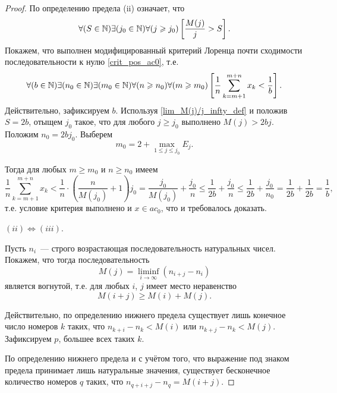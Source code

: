 \begin{proof}
	По определению предела (ii) означает, что
	\begin{equation}\label{lim_M(j)/j_infty_def}
		\forall(S  \in\mathbb{N})
		\exists(j_0\in\mathbb{N})
		\forall(j \geqslant j_0)
		\left[
			\frac{M(j)}{j}>S
		\right]
		.
	\end{equation}
	Покажем, что выполнен модифицированный критерий Лоренца почти сходимости последовательности к нулю
	\eqref{crit_pos_ac0}, т.е.
	\begin{equation}
		\forall(b  \in\mathbb{N})
		\exists(n_0\in\mathbb{N})
		\exists(m_0\in\mathbb{N})
		\forall(n\geqslant n_0)
		\forall(m\geqslant m_0)
		\\
		\left[
			\frac{1}{n}
			\sum_{k=m+1}^{m+n} x_k
			<
			\frac{1}{b}
		\right]
		.
	\end{equation} Действительно, зафиксируем $b$.
	Используя \eqref{lim_M(j)/j_infty_def} и положив $S=2b$,
	отыщем $j_0$ такое, что для любого $j\geq j_0$ выполнено
	$M(j)>2bj$.
	Положим $n_0 = 2bj_0$.
	Выберем
	$$
		m_0 = 2+\max_{1\leq j \leq j_0} E_j
		.
	$$

	Тогда для любых $m\geq m_0$ и $n\geq n_0$ имеем
	\begin{equation}
		\frac{1}{n} \sum_{k=m+1}^{m+n} x_k
		<
		\frac{1}{n} \cdot \left( \frac{n}{M(j_0)} + 1 \right) j_0
		=
		\frac{j_0}{M(j_0)} + \frac{j_0}{n}
		\leq
		\frac{1}{2b} + \frac{j_0}{n}
		\leq
		\frac{1}{2b} + \frac{j_0}{n_0}
		=
		\frac{1}{2b} + \frac{1}{2b}
		=
		\frac{1}{b}
		,
	\end{equation}
	т.е. условие критерия выполнено
	и $x\in ac_0$,
	что и требовалось доказать.

$(ii) \Leftrightarrow (iii).$

	Пусть $n_i$~--- строго возрастающая последовательность натуральных чисел.
	Покажем, что тогда последовательность
	\begin{equation}
		M(j) = \liminf_{i\to\infty} \left(n_{i+j} - n_i\right)
	\end{equation}
	является вогнутой, т.е. для любых $i$, $j$ имеет место неравенство
	\begin{equation}\label{S_j_addit}
		M(i+j) \geq M(i) + M(j)
		.
	\end{equation}

	Действительно,
	по определению нижнего предела существует лишь конечное число номеров $k$
	таких, что $n_{k+i} - n_k < M(i)$ или $n_{k+j} - n_k < M(j)$.
	Зафиксируем $p$, большее всех таких $k$.

	По определению нижнего предела и с учётом того, что выражение под знаком предела
	принимает лишь натуральные значения,
	существует бесконечное количество номеров $q$ таких, что $n_{q+i+j} - n_q = M(i+j)$.


\end{proof}
